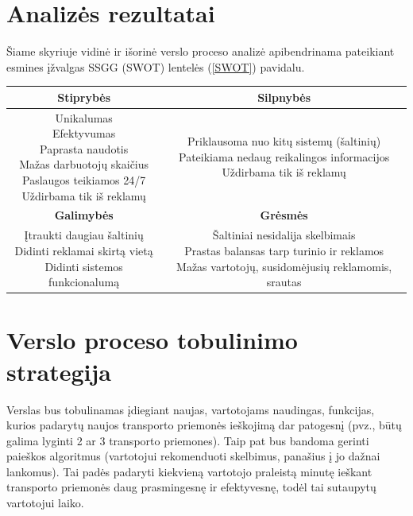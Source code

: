 \documentclass[12pt]{article}
\begin{document}
	\section{Analizės rezultatai}
	
	Šiame skyriuje vidinė ir išorinė verslo proceso analizė apibendrinama pateikiant esmines įžvalgas SSGG (SWOT) lentelės (\ref{SWOT}) pavidalu.
	
	\begin{center}
		\begin{tabular}{ | c | c | }
			\hline
			\textbf{Stiprybės} & \textbf{Silpnybės} \\ \hline 
			\makecell{Unikalumas \\ Efektyvumas \\ Paprasta naudotis \\ Mažas darbuotojų skaičius \\ Paslaugos teikiamos 24/7 \\ Uždirbama tik iš reklamų} & \makecell{Priklausoma nuo kitų sistemų (šaltinių) \\ Pateikiama nedaug reikalingos informacijos \\ Uždirbama tik iš reklamų} \\ \hline
			\textbf{Galimybės} & \textbf{Grėsmės} \\ \hline
			\makecell{Įtraukti daugiau šaltinių \\ Didinti reklamai skirtą vietą \\ Didinti sistemos funkcionalumą} & \makecell{Šaltiniai nesidalija skelbimais \\ Prastas balansas tarp turinio ir reklamos \\ Mažas vartotojų, susidomėjusių reklamomis, srautas} \\ \hline 
		\end{tabular}
	\end{center}
	\pagebreak
	
	\section{Verslo proceso tobulinimo strategija}
	
	Verslas bus tobulinamas įdiegiant naujas, vartotojams naudingas, funkcijas, kurios padarytų naujos transporto priemonės ieškojimą dar patogesnį (pvz., būtų galima lyginti 2 ar 3 transporto priemones). Taip pat bus bandoma gerinti paieškos algoritmus (vartotojui rekomenduoti skelbimus, panašius į jo dažnai lankomus). Tai padės padaryti kiekvieną vartotojo praleistą minutę ieškant transporto priemonės daug prasmingesnę ir efektyvesnę, todėl tai sutaupytų vartotojui laiko.
	\bigskip	
	
\end{document}
